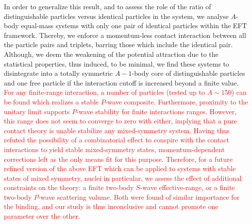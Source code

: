 \documentclass[preprint,12pt]{elsarticle}
\newcommand{\lc}{\ensuremath{\Lambda_c}}
\newcommand{\red}[1]{\textcolor{red}{#1}}
\newcommand{\ie}{\textit{i.e.}~}
\begin{document}
In order to generalize this result, and to assess the role of the ratio of distinguishable particles versus identical
particles in the system, we analyse $A$-body equal-mass systems with only one pair of identical particles within the EFT framework.
Thereby, we enforce a momentum-less contact interaction between all the particle pairs and triplets, barring those which include the
identical pair. 
Although, we deem the weakening of the potential attraction due to the statistical properties, thus induced, to be minimal,
we find these systems to disintegrate into a totally symmetric $A-1$-body core of distinguishable particles and one free particle
if the interaction cutoff is increased beyond a finite value.
\red{For any finite-range interaction, a number of particles (tested up to $A\sim150$) can be found which realizes a stable $P$-wave composite.
Furthermore, proximity to the unitary limit supports $P$-wave stability for finite interactions ranges.
However, this range does not seem to converge to zero with either, implying that a pure contact theory is unable stabilize any mixed-symmetry
system. Having thus refuted the possibility of a combinatorial effect to conspire with the contact interactions to yield stable
mixed-symmetry states, momentum-dependent corrections left as the only means fit for this purpose.
Therefore, for a future refined version of the above EFT which can be applied to systems with stable states of mixed symmetry,
nuclei in particular, we assess the effect of additional constraints on the theory: a finite two-body $S$-wave effective-range,
or a finite two-body $P$-wave scattering volume. 
Both were found of similar importance for the binding, and our study is thus inconclusive and cannot promote one parameter over the other.
}
\end{document}
